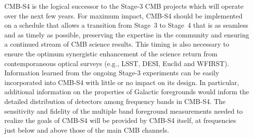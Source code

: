 %


CMB-S4 is the logical successor to the Stage-3 CMB projects which will operate over the next few years. For maximum impact, CMB-S4 should be implemented on a schedule that allows a transition from Stage~3 to Stage~4 that is as seamless and as timely as possible, preserving the expertise in the community and ensuring a continued stream of CMB science results. This timing is also necessary to ensure the optimum synergistic enhancement of the science return from contemporaneous optical surveys (e.g., LSST, DESI, Euclid and WFIRST).   Information learned from the ongoing Stage-3 experiments can be easily incorporated into CMB-S4 with little or no impact on its design. In particular, additional information on the properties of Galactic foregrounds would inform  the detailed distribution of detectors among frequency bands in CMB-S4. %
The sensitivity and fidelity of the multiple band foreground measurements needed to realize the goals of CMB-S4 will be provided by CMB-S4 itself, at frequencies just below and above those of the main CMB channels. 

